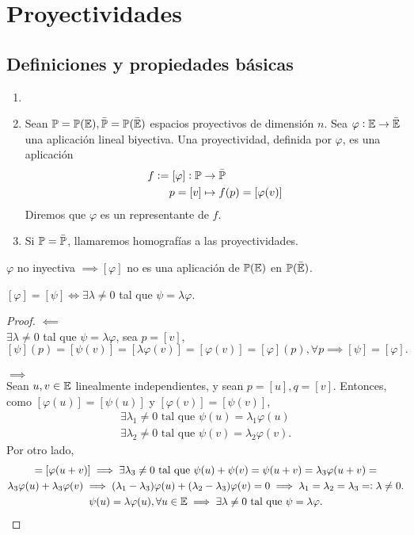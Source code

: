\chapter{Proyectividades}
\section{Definiciones y propiedades básicas}

\begin{defi}
	\begin{enumerate}
		\item[]
		\item Sean $\mathbb{P} = \mathbb{P}(\mathbb{E}), \bar{\mathbb{P}} = \mathbb{P}(\bar{\mathbb{E}})$ espacios proyectivos de dimensión $n$. Sea $\varphi : \mathbb{E} \to \bar{\mathbb{E}}$ una aplicación lineal biyectiva. Una proyectividad, definida por $\varphi$, es una aplicación
		\begin{align*}
			f := [\varphi] : \mathbb{P} &\to \bar{\mathbb{P}} \\
			p = [v] &\mapsto f(p) = [\varphi(v)]
		\end{align*}
		Diremos que $\varphi$ es un representante de $f$.
		\item Si $\mathbb{P} = \bar{\mathbb{P}}$, llamaremos homografías a las proyectividades.
	\end{enumerate}
\end{defi}
\begin{obs}
	$\varphi$ no inyectiva $\implies [\varphi]$ no es una aplicación de $\mathbb{P}(\mathbb{E})$ en $\mathbb{P}(\bar{\mathbb{E}})$.
\end{obs}
\begin{obs}
	$[\varphi] = [\psi] \iff \exists \lambda \neq 0$ tal que $\psi = \lambda \varphi$.
\end{obs}
\begin{proof}
	$\impliedby$ \\
	$\exists \lambda \neq 0$ tal que $\psi = \lambda\varphi$, sea $p = [v]$, $[\psi](p) = [\psi(v)] = [\lambda\varphi(v)] = [\varphi(v)] = [\varphi](p), \forall p \implies [\psi] = [\varphi].$ \\ \\
	$\implies$ \\
	Sean $u, v \in \mathbb{E}$ linealmente independientes, y sean $p = [u], q = [v]$. Entonces, como $[\varphi(u)] = [\psi(u)]$ y $[\varphi(v)] = [\psi(v)]$,
	\begin{gather*}
		\exists \lambda_1 \neq 0 \text{ tal que } \psi(u) = \lambda_1 \varphi(u) \\
		\exists \lambda_2 \neq 0 \text{ tal que } \psi(v) = \lambda_2 \varphi(v).
	\end{gather*}
	Por otro lado,
	\begin{gather*}
		[\psi(u+v)] = [\varphi(u+v)] \implies \exists \lambda_3 \neq 0 \text{ tal que } \psi(u) + \psi(v) = \psi(u+v) = \lambda_3 \varphi(u+v) = \\ \lambda_3 \varphi(u) + \lambda_3 \varphi(v) \implies (\lambda_1 - \lambda_3) \varphi(u) + (\lambda_2-\lambda_3) \varphi(v) = 0 \implies \lambda_1 = \lambda_2 = \lambda_3 =: \lambda \neq 0. \\
		\psi(u) = \lambda \varphi(u), \forall u \in \E \implies \exists \lambda \neq 0 \text{ tal que } \psi = \lambda \varphi.
	\end{gather*}
\end{proof}
